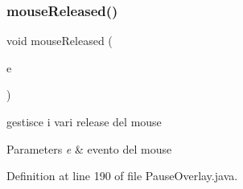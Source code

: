 \subsubsection{\texorpdfstring{mouse\+Released()}{mouseReleased()}}
{\footnotesize\ttfamily void mouse\+Released (\begin{DoxyParamCaption}\item[{Mouse\+Event}]{e }\end{DoxyParamCaption})}



gestisce i vari release del mouse 


\begin{DoxyParams}{Parameters}
{\em e} & evento del mouse \\
\hline
\end{DoxyParams}


Definition at line 190 of file Pause\+Overlay.\+java.

